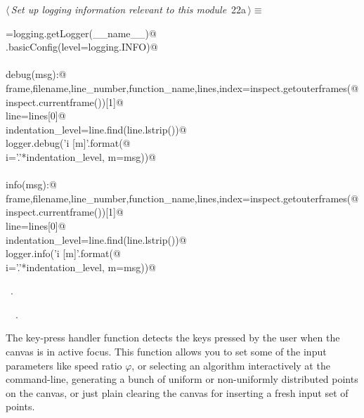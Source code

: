 \documentclass[11.5pt]{report}
\begin{document}
\begin{flushleft} \small
\begin{minipage}{\linewidth}\label{scrap15}\raggedright\small
{} $\langle\,${\itshape Set up logging information relevant to this module}\nobreak\ {\footnotesize {22a}}$\,\rangle\equiv$
\vspace{-1ex}
\begin{list}{}{} \item
\mbox{}\verb@logger=logging.getLogger(__name__)@\\
\mbox{}\verb@logging.basicConfig(level=logging.INFO)@\\
\mbox{}\verb@@\\
\mbox{}\verb@def debug(msg):@\\
\mbox{}\verb@    frame,filename,line_number,function_name,lines,index=inspect.getouterframes(@\\
\mbox{}\verb@        inspect.currentframe())[1]@\\
\mbox{}\verb@    line=lines[0]@\\
\mbox{}\verb@    indentation_level=line.find(line.lstrip())@\\
\mbox{}\verb@    logger.debug('{i} [{m}]'.format(@\\
\mbox{}\verb@        i='.'*indentation_level, m=msg))@\\
\mbox{}\verb@@\\
\mbox{}\verb@def info(msg):@\\
\mbox{}\verb@    frame,filename,line_number,function_name,lines,index=inspect.getouterframes(@\\
\mbox{}\verb@        inspect.currentframe())[1]@\\
\mbox{}\verb@    line=lines[0]@\\
\mbox{}\verb@    indentation_level=line.find(line.lstrip())@\\
\mbox{}\verb@    logger.info('{i} [{m}]'.format(@\\
\mbox{}\verb@        i='.'*indentation_level, m=msg))@\\
\mbox{}\verb@@{\NWsep}
\end{list}
\vspace{-1.5ex}
\footnotesize
\begin{list}{}{\setlength{\itemsep}{-\parsep}\setlength{\itemindent}{-\leftmargin}}
\item \NWtxtMacroRefIn\ .
\item \NWtxtIdentsUsed\nobreak\  \verb@logger@\nobreak\ .
\item{}
\end{list}
\end{minipage}\vspace{4ex}
\end{flushleft}
\vspace{-0.8cm}\newchunk The key-press handler function detects the keys pressed by the user when the canvas
is in active focus. This function allows you to set some of the input parameters like 
speed ratio $\varphi$, or selecting an algorithm interactively at the command-line, 
generating a bunch of uniform or non-uniformly distributed points on the canvas, 
or just plain clearing the canvas for inserting a fresh input set of points. 
\end{document}
